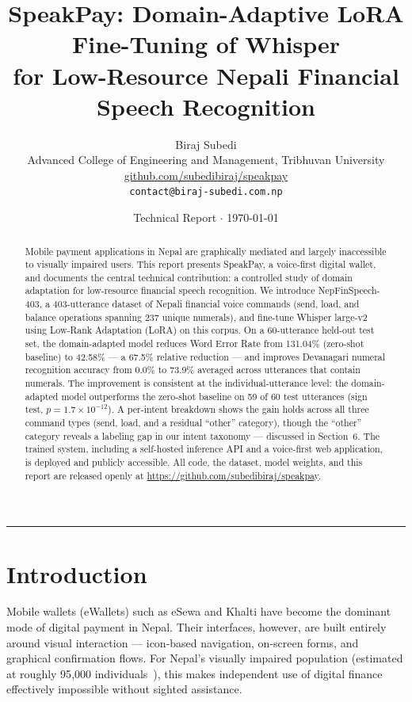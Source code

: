 \documentclass[11pt,a4paper]{article}
\title{
    \vspace{-1cm}
    {\LARGE \textbf{SpeakPay: Domain-Adaptive LoRA Fine-Tuning of Whisper\\[4pt]
    for Low-Resource Nepali Financial Speech Recognition}}
}
\author{
    Biraj Subedi \\
    \small Advanced College of Engineering and Management, Tribhuvan University \\
    \small \href{https://github.com/subedibiraj/speakpay}{github.com/subedibiraj/speakpay} \\
    \small \texttt{contact@biraj-subedi.com.np}
}
\date{Technical Report $\cdot$ \today}
\begin{document}
\maketitle

\begin{abstract}
Mobile payment applications in Nepal are graphically mediated and largely
inaccessible to visually impaired users. This report presents SpeakPay, a
voice-first digital wallet, and documents the central technical
contribution: a controlled study of domain adaptation for low-resource
financial speech recognition. We introduce NepFinSpeech-403, a 403-utterance
dataset of Nepali financial voice commands (send, load, and balance
operations spanning 237 unique numerals), and fine-tune Whisper large-v2
using Low-Rank Adaptation (LoRA) on this corpus. On a 60-utterance held-out
test set, the domain-adapted model reduces Word Error Rate from 131.04\%
(zero-shot baseline) to 42.58\% --- a 67.5\% relative reduction --- and
improves Devanagari numeral recognition accuracy from 0.0\% to 73.9\%
averaged across utterances that contain numerals. The improvement is
consistent at the individual-utterance level: the domain-adapted model
outperforms the zero-shot baseline on 59 of 60 test utterances (sign test,
$p = 1.7\times10^{-12}$). A per-intent breakdown shows the gain holds across
all three command types (send, load, and a residual ``other'' category),
though the ``other'' category reveals a labeling gap in our intent
taxonomy --- discussed in Section~6. The trained system, including a
self-hosted inference API and a voice-first web application, is deployed
and publicly accessible. All code, the dataset, model weights, and this
report are released openly at
\url{https://github.com/subedibiraj/speakpay}.
\end{abstract}

\vspace{0.5em}
\hrule
\vspace{1em}

\section{Introduction}

Mobile wallets (eWallets) such as eSewa and Khalti have become the dominant
mode of digital payment in Nepal. Their interfaces, however, are built
entirely around visual interaction --- icon-based navigation, on-screen
forms, and graphical confirmation flows. For Nepal's visually impaired
population (estimated at roughly 95{,}000 individuals~\cite{who2019}), this
makes independent use of digital finance effectively impossible without
sighted assistance.
\end{document}
